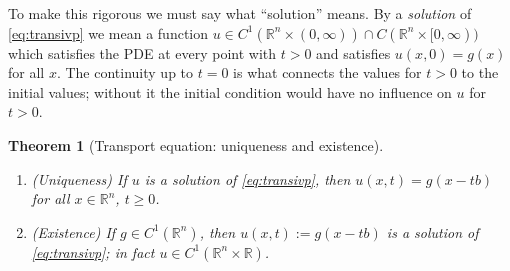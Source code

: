 \documentclass[11pt]{article}
\theoremstyle{plain}
\newtheorem{theorem}{Theorem}[section]
\theoremstyle{definition}
\theoremstyle{remark}
\begin{document}
To make this rigorous we must say what ``solution'' means. By a \emph{solution} of \eqref{eq:transivp} we mean a function $u \in C^1(\mathbb{R}^n \times (0,\infty)) \cap C(\mathbb{R}^n \times [0,\infty))$ which satisfies the PDE at every point with $t > 0$ and satisfies $u(x,0) = g(x)$ for all $x$. The continuity up to $t = 0$ is what connects the values for $t > 0$ to the initial values; without it the initial condition would have no influence on $u$ for $t > 0$.

\begin{theorem}[Transport equation: uniqueness and existence]\label{thm:transport}
\begin{enumerate}
    \item[(a)] (Uniqueness) If $u$ is a solution of \eqref{eq:transivp}, then $u(x,t) = g(x - tb)$ for all $x \in \mathbb{R}^n$, $t \geq 0$.
    \item[(b)] (Existence) If $g \in C^1(\mathbb{R}^n)$, then $u(x,t) := g(x - tb)$ is a solution of \eqref{eq:transivp}; in fact $u \in C^1(\mathbb{R}^n \times \mathbb{R})$.
\end{enumerate}
\end{theorem}
\end{document}
